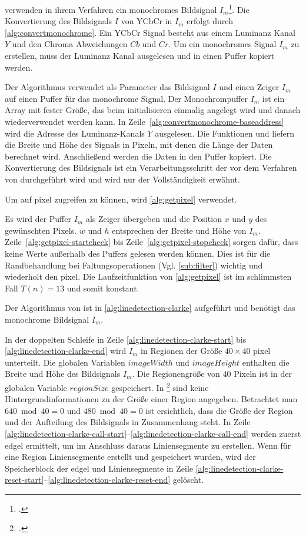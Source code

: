 \citeauthor{clarke96} verwenden in ihrem Verfahren ein monochromes Bildsignal $I_m$\footcite[Vgl.][S.~417]{clarke96}.
 Die Konvertierung des Bildsignals $I$ von YCbCr in $I_m$ erfolgt durch \autoref{alg:convertmonochrome}. Ein YCbCr
 Signal besteht aus einem Luminanz Kanal $Y$ und den Chroma Abweichungen $Cb$ und $Cr$. Um ein monochromes Signal $I_m$
 zu erstellen, muss der Luminanz Kanal ausgelesen und in einen Puffer kopiert werden.

Der Algorithmus verwendet als Parameter das Bildsignal $I$ und einen Zeiger $I_m$ auf einen Puffer für das monochrome
 Signal. Der Monochrompuffer $I_m$ ist ein Array mit fester Größe, das beim initialisieren einmalig angelegt wird und
 danach wiederverwendet werden kann. In Zeile~\ref{alg:convertmonochrome-baseaddress} wird die Adresse des
 Luminanz-Kanals $Y$ ausgelesen. Die Funktionen  und  liefern die Breite und Höhe des
 Signals in Pixeln, mit denen die Länge der Daten berechnet wird. Anschließend werden die Daten in den Puffer kopiert.
 Die Konvertierung des Bildsignals ist ein Verarbeitungsschritt der vor dem Verfahren von \citeauthor{clarke96}
 durchgeführt wird und wird nur der Vollständigkeit erwähnt.

Um auf \gls{pixel} zugreifen zu können, wird \autoref{alg:getpixel} verwendet.

Es wird der Puffer $I_m$ als Zeiger übergeben und die Position $x$ und $y$ des gewünschten Pixels. $w$ und $h$
 entsprechen der Breite und Höhe von $I_m$. Zeile~\ref{alg:getpixel-startcheck} bis Zeile~\ref{alg:getpixel-stopcheck}
 sorgen dafür, dass keine Werte außerhalb des Puffers gelesen werden können. Dies ist für die Randbehandlung bei
 Faltungsoperationen (Vgl. \autoref{sub:filter}) wichtig und wiederholt den \gls{pixel}. Die Laufzeitfunktion von
 \autoref{alg:getpixel} ist im schlimmsten Fall $T(n) = 13$ und somit konstant.

Der Algorithmus von \citeauthor{clarke96} ist in \autoref{alg:linedetection-clarke} aufgeführt und benötigt das
 monochrome Bildsignal $I_m$.

In der doppelten Schleife in Zeile \ref{alg:linedetection-clarke-start} bis \ref{alg:linedetection-clarke-end} wird
 $I_m$ in Regionen der Größe $40 \times 40$ \gls{pixel} unterteilt. Die globalen Variablen $\mathit{imageWidth}$ und
 $\mathit{imageHeight}$ enthalten die Breite und Höhe des Bildsignals $I_m$. Die Regionengröße von $40$ Pixeln ist
 in der globalen Variable $\mathit{regionSize}$ gespeichert. In \citeauthor{clarke96}\footcite{clarke96} sind keine
 Hintergrundinformationen zu der Größe einer Region angegeben. Betrachtet man $640 \bmod 40 = 0$ und $480 \bmod 40 = 0$
 ist ersichtlich, dass die Größe der Region und der Aufteilung des Bildsignals in Zusammenhang steht. In Zeile
 \ref{alg:linedetection-clarke-call-start}--\ref{alg:linedetection-clarke-call-end} werden zuerst \gls{edgel}
 ermittelt, um im Anschluss daraus Liniensegmente zu erstellen. Wenn für eine Region Liniensegmente erstellt und
 gespeichert wurden, wird der Speicherblock der \gls{edgel} und Liniensegmente in Zeile
 \ref{alg:linedetection-clarke-reset-start}--\ref{alg:linedetection-clarke-reset-end} gelöscht.

